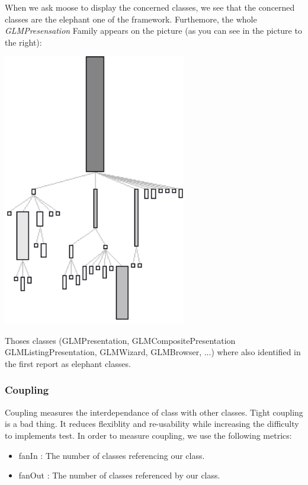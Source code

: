 \documentclass[11pt,a4paper]{article}
\begin{document}
\begin{minipage}[t]{0.4\textwidth}
When we ask moose to display the concerned classes, we see that the concerned classes are the elephant one of the framework. Furthemore, the whole \textit{GLMPresensation} Family appears on the picture (as you can see in the picture to the right):

\end{minipage}
\hfill
\begin{minipage}[t]{0.6\textwidth}
    \centering
     \vspace{-1.5ex}
\includegraphics[width=0.6\textwidth]{GLMPresentation_family}
\end{minipage} 


Thoses classes (GLMPresentation, GLMCompositePresentation GLMListingPresentation, GLMWizard, GLMBrowser, ...)  where also identified in the first report as elephant  classes.\\
\subsubsection{Coupling}
Coupling measures the interdependance of class with other classes. Tight coupling is a bad thing. It reduces flexiblity and re-usability while increasing the difficulty to implements test. In order to measure coupling, we use the following metrics:
\begin{itemize}
\item fanIn : The number of classes referencing our class.
\item fanOut : The number of classes referenced by our class.
\end{itemize} 
\end{document}
